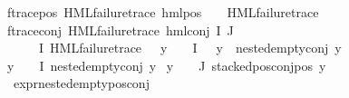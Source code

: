 \begin{isabellebody}
f{\isacharunderscore}{\kern0pt}trace{\isacharunderscore}{\kern0pt}pos{\isacharcolon}{\kern0pt}\ {\isachardoublequoteopen}HML{\isacharunderscore}{\kern0pt}failure{\isacharunderscore}{\kern0pt}trace\ {\isacharparenleft}{\kern0pt}hml{\isacharunderscore}{\kern0pt}pos\ {\isasymalpha}\ {\isasymphi}{\isacharparenright}{\kern0pt}{\isachardoublequoteclose}\ \ {\isachardoublequoteopen}HML{\isacharunderscore}{\kern0pt}failure{\isacharunderscore}{\kern0pt}trace\ {\isasymphi}{\isachardoublequoteclose}{\isacharbar}{\kern0pt}\isanewline
f{\isacharunderscore}{\kern0pt}trace{\isacharunderscore}{\kern0pt}conj{\isacharcolon}{\kern0pt}\ {\isachardoublequoteopen}HML{\isacharunderscore}{\kern0pt}failure{\isacharunderscore}{\kern0pt}trace\ {\isacharparenleft}{\kern0pt}hml{\isacharunderscore}{\kern0pt}conj\ I\ J\ {\isasymPhi}{\isacharparenright}{\kern0pt}{\isachardoublequoteclose}\isanewline
{}\ {\isachardoublequoteopen}{\isacharparenleft}{\kern0pt}{\isacharparenleft}{\kern0pt}{\isasymexists}{\isasympsi}\ {\isasymin}\ {\isacharparenleft}{\kern0pt}{\isasymPhi}\ {\isacharbackquote}{\kern0pt}\ I{\isacharparenright}{\kern0pt}{\isachardot}{\kern0pt}\ {\isacharparenleft}{\kern0pt}HML{\isacharunderscore}{\kern0pt}failure{\isacharunderscore}{\kern0pt}trace\ {\isasympsi}{\isacharparenright}{\kern0pt}\ {\isasymand}\ {\isacharparenleft}{\kern0pt}{\isasymforall}y\ {\isasymin}\ {\isacharparenleft}{\kern0pt}{\isasymPhi}\ {\isacharbackquote}{\kern0pt}\ I{\isacharparenright}{\kern0pt}{\isachardot}{\kern0pt}\ {\isasympsi}\ {\isasymnoteq}\ y\ {\isasymlongrightarrow}\ nested{\isacharunderscore}{\kern0pt}empty{\isacharunderscore}{\kern0pt}conj\ y{\isacharparenright}{\kern0pt}{\isacharparenright}{\kern0pt}\ {\isasymor}\ \isanewline
{\isacharparenleft}{\kern0pt}{\isasymforall}y\ {\isasymin}\ {\isacharparenleft}{\kern0pt}{\isasymPhi}\ {\isacharbackquote}{\kern0pt}\ I{\isacharparenright}{\kern0pt}{\isachardot}{\kern0pt}\ nested{\isacharunderscore}{\kern0pt}empty{\isacharunderscore}{\kern0pt}conj\ y{\isacharparenright}{\kern0pt}{\isacharparenright}{\kern0pt}\ {\isasymand}\isanewline
{\isacharparenleft}{\kern0pt}{\isasymforall}y\ {\isasymin}\ {\isacharparenleft}{\kern0pt}{\isasymPhi}\ {\isacharbackquote}{\kern0pt}\ J{\isacharparenright}{\kern0pt}{\isachardot}{\kern0pt}\ stacked{\isacharunderscore}{\kern0pt}pos{\isacharunderscore}{\kern0pt}conj{\isacharunderscore}{\kern0pt}pos\ y{\isacharparenright}{\kern0pt}{\isachardoublequoteclose}\isanewline
\isanewline
{}\isamarkupfalse%
\ expr{\isacharunderscore}{\kern0pt}nested{\isacharunderscore}{\kern0pt}empty{\isacharunderscore}{\kern0pt}pos{\isacharunderscore}{\kern0pt}conj{\isacharcolon}{\kern0pt}\isanewline

\end{isabellebody}
